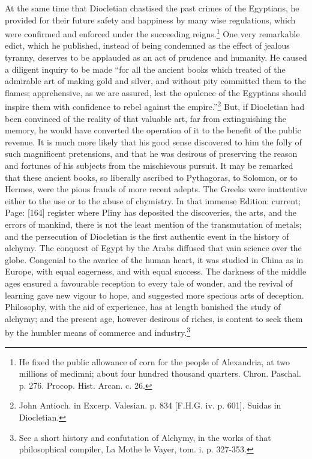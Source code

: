 At the same time that Diocletian chastised the past crimes of the Egyptians, he provided for their future safety and happiness by many wise regulations, which were confirmed and enforced under the succeeding reigns.\footnote{He fixed the public allowance of corn for the people of Alexandria, at two millions of medimni; about four hundred thousand quarters. Chron. Paschal. p. 276. Procop. Hist. Arcan. c. 26.} One very remarkable edict, which he published, instead of being condemned as the effect of jealous tyranny, deserves to be applauded as an act of prudence and humanity. He caused a diligent inquiry to be made \texthebrew{“}for all the ancient books which treated of the admirable art of making gold and silver, and without pity committed them to the flames; apprehensive, as we are assured, lest the opulence of the Egyptians should inspire them with confidence to rebel against the empire.\texthebrew{}”\footnote{John Antioch. in Excerp. Valesian. p. 834 [F.H.G. iv. p. 601]. Suidas in Diocletian.} But, if Diocletian had been convinced of the reality of that valuable art, far from extinguishing the memory, he would have converted the operation of it to the benefit of the public revenue. It is much more likely that his good sense discovered to him the folly of such magnificent pretensions, and that he was desirous of preserving the reason and fortunes of his subjects from the mischievous pursuit. It may be remarked that these ancient books, so liberally ascribed to Pythagoras, to Solomon, or to Hermes, were the pious frauds of more recent adepts. The Greeks were inattentive either to the use or to the abuse of chymistry. In that immense Edition: current; Page: [164] register where Pliny has deposited the discoveries, the arts, and the errors of mankind, there is not the least mention of the transmutation of metals; and the persecution of Diocletian is the first authentic event in the history of alchymy. The conquest of Egypt by the Arabs diffused that vain science over the globe. Congenial to the avarice of the human heart, it was studied in China as in Europe, with equal eagerness, and with equal success. The darkness of the middle ages ensured a favourable reception to every tale of wonder, and the revival of learning gave new vigour to hope, and suggested more specious arts of deception. Philosophy, with the aid of experience, has at length banished the study of alchymy; and the present age, however desirous of riches, is content to seek them by the humbler means of commerce and industry.\footnote{See a short history and confutation of Alchymy, in the works of that philosophical compiler, La Mothe le Vayer, tom. i. p. 327-353.}


